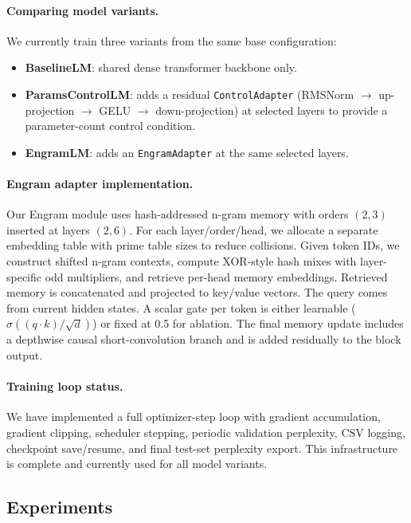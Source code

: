 \documentclass[11pt]{article}
\begin{document}
\paragraph{Comparing model variants.}
We currently train three variants from the same base configuration:
\begin{itemize}
	\item \textbf{BaselineLM}: shared dense transformer backbone only.
	\item \textbf{ParamsControlLM}: adds a residual \texttt{ControlAdapter} (RMSNorm $\rightarrow$ up-projection $\rightarrow$ GELU $\rightarrow$ down-projection) at selected layers to provide a parameter-count control condition.
	\item \textbf{EngramLM}: adds an \texttt{EngramAdapter} at the same selected layers.
\end{itemize}

\paragraph{Engram adapter implementation.}
Our Engram module uses hash-addressed n-gram memory with orders $(2,3)$ inserted at layers $(2,6)$.
For each layer/order/head, we allocate a separate embedding table with prime table sizes to reduce collisions.
Given token IDs, we construct shifted n-gram contexts, compute XOR-style hash mixes with layer-specific odd multipliers, and retrieve per-head memory embeddings.
Retrieved memory is concatenated and projected to key/value vectors.
The query comes from current hidden states.
A scalar gate per token is either learnable ($\sigma((q\cdot k)/\sqrt{d})$) or fixed at 0.5 for ablation.
The final memory update includes a depthwise causal short-convolution branch and is added residually to the block output.

\paragraph{Training loop status.}
We have implemented a full optimizer-step loop with gradient accumulation, gradient clipping, scheduler stepping, periodic validation perplexity, CSV logging, checkpoint save/resume, and final test-set perplexity export.
This infrastructure is complete and currently used for all model variants.


\subsection{Experiments}
\end{document}
